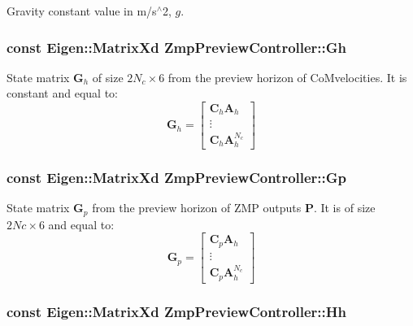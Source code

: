 \-Gravity constant value in m/s$^\wedge$2, $ g $. \hypertarget{classZmpPreviewController_a9429cb06fdd2c3ca5036a2fd48303632}{
\subsubsection[{\-Gh}]{\setlength{\rightskip}{0pt plus 5cm}const \-Eigen\-::\-Matrix\-Xd {\bf \-Zmp\-Preview\-Controller\-::\-Gh}}}\label{classZmpPreviewController_a9429cb06fdd2c3ca5036a2fd48303632}
\-State matrix $\mathbf{G}_h$ of size $2N_c \times 6$ from the preview horizon of \-Co\-Mvelocities. \-It is constant and equal to\-: \[ \mathbf{G}_h = \left[\begin{array}{c} \mathbf{C}_h\mathbf{A}_h \\ \vdots \\ \mathbf{C}_h\mathbf{A}^{N_c}_h \end{array}\right] \] \hypertarget{classZmpPreviewController_a53a7d8af5be4a5d5cea99fad2ea48979}{
\subsubsection[{\-Gp}]{\setlength{\rightskip}{0pt plus 5cm}const \-Eigen\-::\-Matrix\-Xd {\bf \-Zmp\-Preview\-Controller\-::\-Gp}}}\label{classZmpPreviewController_a53a7d8af5be4a5d5cea99fad2ea48979}
\-State matrix $\mathbf{G}_p$ from the preview horizon of \-Z\-M\-P outputs $\mathbf{P}$. \-It is of size $2Nc \times 6$ and equal to\-: \[ \mathbf{G}_p = \left[\begin{array}{c} \mathbf{C}_p\mathbf{A}_h \\ \vdots \\ \mathbf{C}_p\mathbf{A}^{N_c}_h \end{array}\right] \] \hypertarget{classZmpPreviewController_a8caaf8bf8f06e5b0b53d2cd5c131eefd}{
\subsubsection[{\-Hh}]{\setlength{\rightskip}{0pt plus 5cm}const \-Eigen\-::\-Matrix\-Xd {\bf \-Zmp\-Preview\-Controller\-::\-Hh}}}\label{classZmpPreviewController_a8caaf8bf8f06e5b0b53d2cd5c131eefd}
